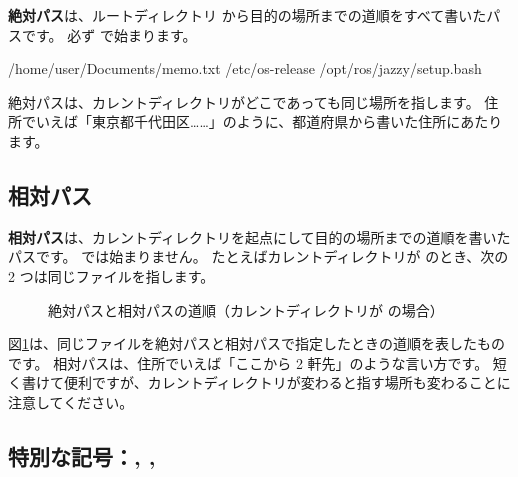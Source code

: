 \textbf{絶対パス}は、ルートディレクトリ \cmd{/} から目的の場所までの道順をすべて書いたパスです。
必ず \cmd{/} で始まります。

\begin{terminal}[絶対パスの例]
/home/user/Documents/memo.txt
/etc/os-release
/opt/ros/jazzy/setup.bash
\end{terminal}

絶対パスは、カレントディレクトリがどこであっても同じ場所を指します。
住所でいえば「東京都千代田区……」のように、都道府県から書いた住所にあたります。

\subsection{相対パス}

\textbf{相対パス}は、カレントディレクトリを起点にして目的の場所までの道順を書いたパスです。
\cmd{/} では始まりません。
たとえばカレントディレクトリが  のとき、次の 2 つは同じファイルを指します。


\begin{figure}[tb]
  \centering
  \large
  \caption{絶対パスと相対パスの道順（カレントディレクトリが  の場合）}
  \label{fig:files-path}
\end{figure}

図\ref{fig:files-path}は、同じファイルを絶対パスと相対パスで指定したときの道順を表したものです。
相対パスは、住所でいえば「ここから 2 軒先」のような言い方です。
短く書けて便利ですが、カレントディレクトリが変わると指す場所も変わることに注意してください。

\subsection{特別な記号：\cmd{\textasciitilde}, , }

